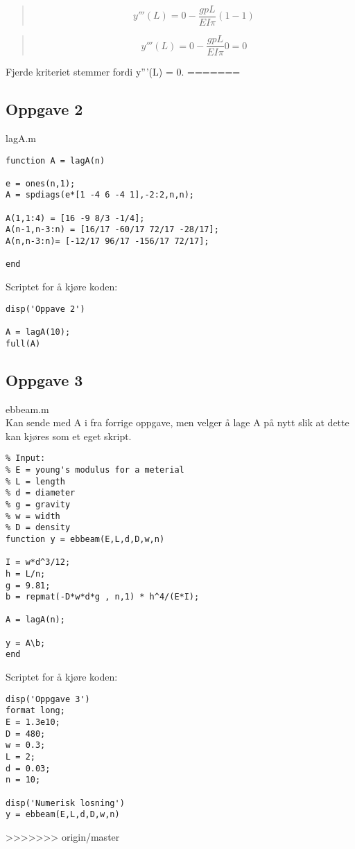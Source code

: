 \begin{quote}
\begin{equation*}
y'''(L) = 0 - \frac{gpL}{EI\pi} (1 - 1)
\end{equation*}
\end{quote}

\begin{quote}
\begin{equation*}
y'''(L) = 0 - \frac{gpL}{EI\pi} 0 = 0
\end{equation*}
\end{quote}
Fjerde kriteriet stemmer fordi y'''(L) = 0.
=======
\subsection{Oppgave 2}

lagA.m
\begin{lstlisting}
function A = lagA(n)

e = ones(n,1);
A = spdiags(e*[1 -4 6 -4 1],-2:2,n,n);

A(1,1:4) = [16 -9 8/3 -1/4];
A(n-1,n-3:n) = [16/17 -60/17 72/17 -28/17];
A(n,n-3:n)= [-12/17 96/17 -156/17 72/17];

end
\end{lstlisting}

Scriptet for å kjøre koden:
\begin{lstlisting}
disp('Oppave 2')

A = lagA(10);
full(A)
\end{lstlisting}

\subsection{Oppgave 3}

ebbeam.m
\\
Kan sende med A i fra forrige oppgave, men velger å lage A på nytt slik at dette kan kjøres som et eget skript.
\begin{lstlisting}
% Input:
% E = young's modulus for a meterial
% L = length
% d = diameter
% g = gravity
% w = width
% D = density
function y = ebbeam(E,L,d,D,w,n)

I = w*d^3/12;
h = L/n;
g = 9.81;
b = repmat(-D*w*d*g , n,1) * h^4/(E*I);

A = lagA(n);

y = A\b;
end
\end{lstlisting}
Scriptet for å kjøre koden:
\begin{lstlisting}
disp('Oppgave 3')
format long;
E = 1.3e10;
D = 480;
w = 0.3;
L = 2;
d = 0.03;
n = 10;

disp('Numerisk losning')
y = ebbeam(E,L,d,D,w,n)
\end{lstlisting}
>>>>>>> origin/master
